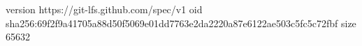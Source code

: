 version https://git-lfs.github.com/spec/v1
oid sha256:69f2f9a41705a88d50f5069e01dd7763e2da2220a87e6122ae503c5fc5c72fbf
size 65632

